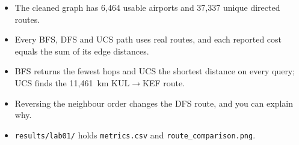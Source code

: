 \begin{verification}
\begin{itemize}
  \item The cleaned graph has 6,464 usable airports and 37,337 unique directed routes.
  \item Every BFS, DFS and UCS path uses real routes, and each reported cost equals the sum of its edge distances.
  \item BFS returns the fewest hops and UCS the shortest distance on every query; UCS finds the 11,461~km KUL$\to$KEF route.
  \item Reversing the neighbour order changes the DFS route, and you can explain why.
  \item \texttt{results/lab01/} holds \texttt{metrics.csv} and \texttt{route\_comparison.png}.
\end{itemize}
\end{verification}
